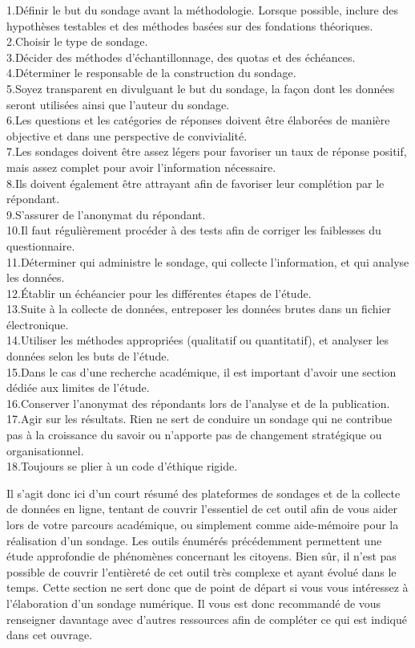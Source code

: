 \documentclass[
  letterpaper,
]{scrbook}
\begin{document}
\hfill\break
1.Définir le but du sondage avant la méthodologie. Lorsque possible,
inclure des hypothèses testables et des méthodes basées sur des
fondations théoriques.\\
2.Choisir le type de sondage.\\
3.Décider des méthodes d'échantillonnage, des quotas et des échéances.\\
4.Déterminer le responsable de la construction du sondage.\\
5.Soyez transparent en divulguant le but du sondage, la façon dont les
données seront utilisées ainsi que l'auteur du sondage.\\
6.Les questions et les catégories de réponses doivent être élaborées de
manière objective et dans une perspective de convivialité.\\
7.Les sondages doivent être assez légers pour favoriser un taux de
réponse positif, mais assez complet pour avoir l'information
nécessaire.\\
8.Ils doivent également être attrayant afin de favoriser leur complétion
par le répondant.\\
9.S'assurer de l'anonymat du répondant.\\
10.Il faut régulièrement procéder à des tests afin de corriger les
faiblesses du questionnaire.\\
11.Déterminer qui administre le sondage, qui collecte l'information, et
qui analyse les données.\\
12.Établir un échéancier pour les différentes étapes de l'étude.\\
13.Suite à la collecte de données, entreposer les données brutes dans un
fichier électronique.\\
14.Utiliser les méthodes appropriées (qualitatif ou quantitatif), et
analyser les données selon les buts de l'étude.\\
15.Dans le cas d'une recherche académique, il est important d'avoir une
section dédiée aux limites de l'étude.\\
16.Conserver l'anonymat des répondants lors de l'analyse et de la
publication.\\
17.Agir sur les résultats. Rien ne sert de conduire un sondage qui ne
contribue pas à la croissance du savoir ou n'apporte pas de changement
stratégique ou organisationnel.\\
18.Toujours se plier à un code d'éthique rigide.

Il s'agit donc ici d'un court résumé des plateformes de sondages et de
la collecte de données en ligne, tentant de couvrir l'essentiel de cet
outil afin de vous aider lors de votre parcours académique, ou
simplement comme aide-mémoire pour la réalisation d'un sondage. Les
outils énumérés précédemment permettent une étude approfondie de
phénomènes concernant les citoyens. Bien sûr, il n'est pas possible de
couvrir l'entièreté de cet outil très complexe et ayant évolué dans le
temps. Cette section ne sert donc que de point de départ si vous vous
intéressez à l'élaboration d'un sondage numérique. Il vous est donc
recommandé de vous renseigner davantage avec d'autres ressources afin de
compléter ce qui est indiqué dans cet ouvrage.
\end{document}
